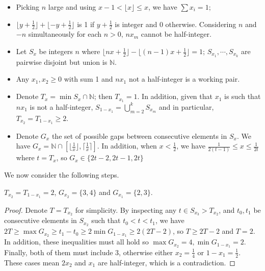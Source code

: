 \documentclass[11pt,a4paper]{article}
\begin{document}
\begin{enumerate}
		\begin{itemize}
			\item Picking $n$ large and using $x - 1 <\lfloor x\rfloor \le x$, we have $\sum x_i = 1$; 
			
			\item $\lfloor y + \frac 12 \rfloor + \lfloor -y + \frac 12 \rfloor$ is 1 if $y + \frac 12$ is integer and 0 otherwise. 
			Considering $n$ and $-n$ simultaneously for each $n > 0$, $nx_m$ cannot be half-integer. 
			
			\item Let $S_x$ be integers $n$ where $\lfloor nx + \frac 12\rfloor - \lfloor (n-1)x + \frac 12\rfloor = 1$; 
			$S_{x_1}, \cdots, S_{x_k}$ are pairwise disjoint but union is $\mathbb{N}$. 
			
			\item Any $x_1, x_2\ge 0$ with sum 1 and $nx_1$ not a half-integer is a working pair. 
			
			\item Denote $T_{x}=\min S_x\cap \mathbb{N}$; then $T_{x_1}=1$. 
			In addition, given that $x_1$ is such that $nx_1$ is not a half-integer, 
			$S_{1 - x_1} = \bigcup_{m=2}^k S_{x_m}$
			and in particular, $T_{x_2} = T_{1-x_1}\ge 2$. 
			
			\item Denote $G_x$ the set of possible gaps between consecutive elements in $S_x$. 
			We have $G_x = \mathbb{N}\cap [\lfloor \frac 1x\rfloor, \lceil \frac 1x\rceil]$. 
			In addition, when $x < \frac 12$, 
			we have $\frac{1}{2(t-1)} \le x \le \frac{1}{2t}$ where $t=T_x$, so $G_x\in \{2t-2, 2t-1, 2t\}$
		\end{itemize}
	    
	    We now consider the following steps. 
	    
	    \begin{lemma}
	    	$T_{x_2}=T_{1-x_1}=2$, $G_{x_2}= \{3, 4\}$ and $G_{x_1}=\{2, 3\}$. 
	    \end{lemma}
        
        \begin{proof}
        	Denote $T = T_{x_2}$ for simplicity. 
        	By inspecting any $t\in S_{x_3} > T_{x_2}$, and $t_0, t_1$ be consecutive elements in $S_{x_2}$ such that $t_0 < t < t_1$, we have $2T\ge \max G_{x_2}\ge t_1 - t_0 \ge 2\min G_{1-x_1}\ge 2(2T-2)$, so $T\ge 2T-2$ and $T=2$. 
        	In addition, these inequalities must all hold so $\max G_{x_2}=4, \min G_{1-x_1}=2$. 
        	Finally, both of them must include 3, otherwise either $x_2=\frac 14$ or $1-x_1=\frac 12$. 
        	These cases mean $2x_2$ and $x_1$ are half-integer, which is a contradiction.
        \end{proof}
        

\end{enumerate}
\end{document}
